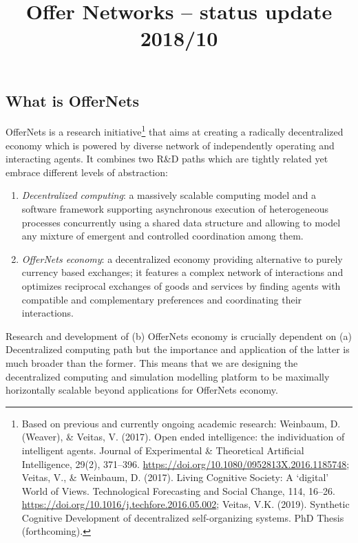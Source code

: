 \documentclass[]{article}
\title{Offer Networks -- status update 2018/10}
\author{}
\date{}
\providecommand{\tightlist}{%
  \setlength{\itemsep}{0pt}\setlength{\parskip}{0pt}}
\let\rmarkdownfootnote\footnote%
\def\footnote{\protect\rmarkdownfootnote}
\begin{document}
\maketitle

\hypertarget{what-is-offernets}{%
\subsection{What is OfferNets}\label{what-is-offernets}}

OfferNets is a research initiative\footnote{Based on previous and
  currently ongoing academic research: Weinbaum, D. (Weaver), \& Veitas,
  V. (2017). Open ended intelligence: the individuation of intelligent
  agents. Journal of Experimental \& Theoretical Artificial
  Intelligence, 29(2), 371--396.
  \url{https://doi.org/10.1080/0952813X.2016.1185748}; Veitas, V., \&
  Weinbaum, D. (2017). Living Cognitive Society: A `digital' World of
  Views. Technological Forecasting and Social Change, 114, 16--26.
  \url{https://doi.org/10.1016/j.techfore.2016.05.002}; Veitas, V.K.
  (2019). Synthetic Cognitive Development of decentralized
  self-organizing systems. PhD Thesis (forthcoming).} that aims at
creating a radically decentralized economy which is powered by diverse
network of independently operating and interacting agents. It combines
two R\&D paths which are tightly related yet embrace different levels of
abstraction:

\begin{enumerate}
\def\labelenumi{(\alph{enumi})}
\tightlist
\item
  \emph{Decentralized computing}: a massively scalable computing model
  and a software framework supporting asynchronous execution of
  heterogeneous processes concurrently using a shared data structure and
  allowing to model any mixture of emergent and controlled coordination
  among them.
\item
  \emph{OfferNets economy}: a decentralized economy providing
  alternative to purely currency based exchanges; it features a complex
  network of interactions and optimizes reciprocal exchanges of goods
  and services by finding agents with compatible and complementary
  preferences and coordinating their interactions.
\end{enumerate}

Research and development of (b) OfferNets economy is crucially dependent
on (a) Decentralized computing path but the importance and application
of the latter is much broader than the former. This means that we are
designing the decentralized computing and simulation modelling platform
to be maximally horizontally scalable beyond applications for OfferNets
economy.
\end{document}
